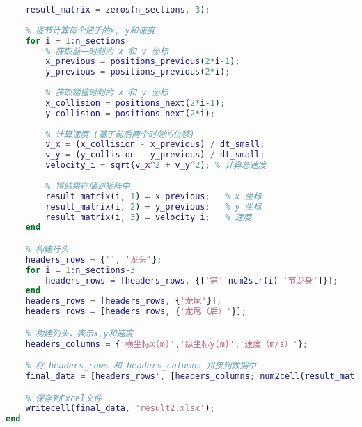 \documentclass[withoutpreface,bwprint]{cumcmthesis1} %
\begin{document}
\begin{appendices}
\begin{lstlisting}[language=matlab]
    % 初始化存储位置和速度的矩阵 (224行, 3列)
    result_matrix = zeros(n_sections, 3);
    
    % 逐节计算每个把手的x, y和速度
    for i = 1:n_sections
        % 获取前一时刻的 x 和 y 坐标
        x_previous = positions_previous(2*i-1);
        y_previous = positions_previous(2*i);
        
        % 获取碰撞时刻的 x 和 y 坐标
        x_collision = positions_next(2*i-1);
        y_collision = positions_next(2*i);
        
        % 计算速度 (基于前后两个时刻的位移)
        v_x = (x_collision - x_previous) / dt_small;
        v_y = (y_collision - y_previous) / dt_small;
        velocity_i = sqrt(v_x^2 + v_y^2); % 计算总速度
        
        % 将结果存储到矩阵中
        result_matrix(i, 1) = x_previous;   % x 坐标
        result_matrix(i, 2) = y_previous;   % y 坐标
        result_matrix(i, 3) = velocity_i;   % 速度
    end

    % 构建行头
    headers_rows = {'', '龙头'};
    for i = 1:n_sections-3
        headers_rows = [headers_rows, {['第' num2str(i) '节龙身']}];
    end
    headers_rows = [headers_rows, {'龙尾'}];
    headers_rows = [headers_rows, {'龙尾（后）'}];

    % 构建列头，表示x,y和速度
    headers_columns = {'横坐标x(m)','纵坐标y(m)','速度（m/s）'};

    % 将 headers_rows 和 headers_columns 拼接到数据中
    final_data = [headers_rows', [headers_columns; num2cell(result_matrix)]];

    % 保存到Excel文件
    writecell(final_data, 'result2.xlsx');
end




\end{lstlisting}


 
\end{appendices}
\end{document}
